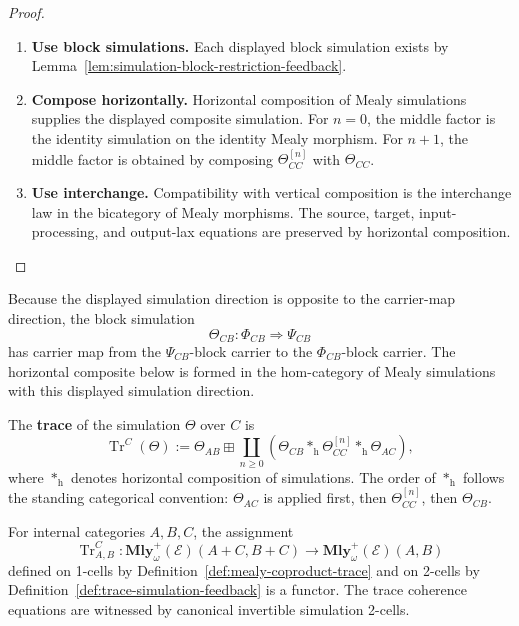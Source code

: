 \begin{proof}
\begin{enumerate}
  \item \textbf{Use block simulations.}
  Each displayed block simulation exists by
  Lemma~\ref{lem:simulation-block-restriction-feedback}.

  \item \textbf{Compose horizontally.}
  Horizontal composition of Mealy simulations supplies the displayed composite
  simulation. For \(n=0\), the middle factor is the identity simulation on the
  identity Mealy morphism. For \(n+1\), the middle factor is obtained by
  composing \(\Theta_{CC}^{[n]}\) with \(\Theta_{CC}\).

  \item \textbf{Use interchange.}
  Compatibility with vertical composition is the interchange law in the
  bicategory of Mealy morphisms. The source, target, input-processing, and
  output-lax equations are preserved by horizontal composition.
\end{enumerate}
\end{proof}

Because the displayed simulation direction is opposite to the carrier-map
direction, the block simulation
\[
  \Theta_{CB}:\Phi_{CB}\Rightarrow\Psi_{CB}
\]
has carrier map from the \(\Psi_{CB}\)-block carrier to the
\(\Phi_{CB}\)-block carrier. The horizontal composite below is formed in the
hom-category of Mealy simulations with this displayed simulation direction.

\begin{definition}
\label{def:trace-simulation-feedback}
The \textbf{trace} of the simulation \(\Theta\) over \(C\) is
\[
  \operatorname{Tr}^{C}(\Theta)
  :=
  \Theta_{AB}
  \boxplus
  \coprod_{n\geq 0}
  \left(
    \Theta_{CB}
    \ast_{\mathrm h}
    \Theta_{CC}^{[n]}
    \ast_{\mathrm h}
    \Theta_{AC}
  \right),
\]
where \(\ast_{\mathrm h}\) denotes horizontal composition of simulations. The
order of \(\ast_{\mathrm h}\) follows the standing categorical convention:
\(\Theta_{AC}\) is applied first, then \(\Theta_{CC}^{[n]}\), then
\(\Theta_{CB}\).
\end{definition}

\begin{theorem}
\label{thm:hom-category-trace-mealy-bicategory}
For internal categories \(A,B,C\), the assignment
\[
  \operatorname{Tr}^{C}_{A,B}:
  \mathbf{Mly}^{+}_{\omega}(\mathcal E)(A+C,B+C)
  \longrightarrow
  \mathbf{Mly}^{+}_{\omega}(\mathcal E)(A,B)
\]
defined on 1-cells by Definition~\ref{def:mealy-coproduct-trace} and on
2-cells by Definition~\ref{def:trace-simulation-feedback} is a functor. The
trace coherence equations are witnessed by canonical invertible simulation
2-cells.
\end{theorem}

